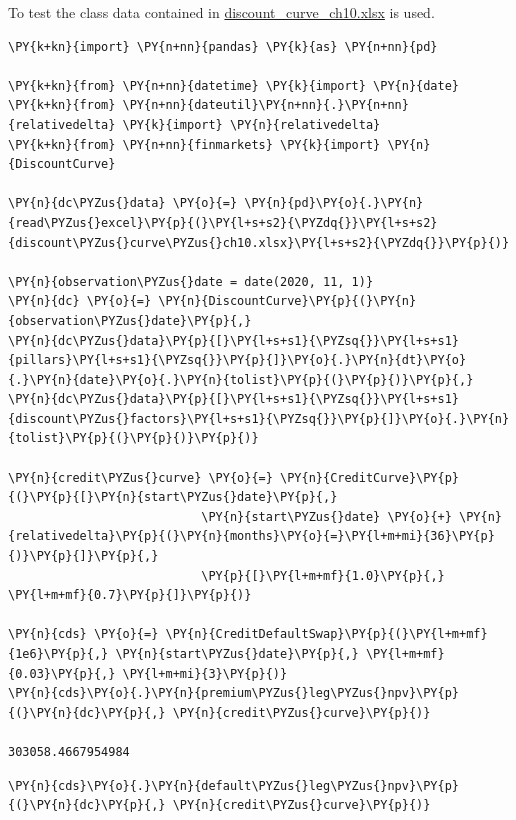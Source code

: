 {To test the class data contained in \href{https://drive.google.com/file/d/1mugHyet3H9tcSAvYvt8G4_kpfaEbVY7b/view?usp=sharing}{discount\_curve\_ch10.xlsx} is used.

\begin{tcolorbox}[breakable, size=fbox, boxrule=1pt, pad at break*=1mm,colback=cellbackground, colframe=cellborder]
\begin{Verbatim}[commandchars=\\\{\}]
\PY{k+kn}{import} \PY{n+nn}{pandas} \PY{k}{as} \PY{n+nn}{pd}
	
\PY{k+kn}{from} \PY{n+nn}{datetime} \PY{k}{import} \PY{n}{date}
\PY{k+kn}{from} \PY{n+nn}{dateutil}\PY{n+nn}{.}\PY{n+nn}{relativedelta} \PY{k}{import} \PY{n}{relativedelta}
\PY{k+kn}{from} \PY{n+nn}{finmarkets} \PY{k}{import} \PY{n}{DiscountCurve}
	
\PY{n}{dc\PYZus{}data} \PY{o}{=} \PY{n}{pd}\PY{o}{.}\PY{n}{read\PYZus{}excel}\PY{p}{(}\PY{l+s+s2}{\PYZdq{}}\PY{l+s+s2}{discount\PYZus{}curve\PYZus{}ch10.xlsx}\PY{l+s+s2}{\PYZdq{}}\PY{p}{)}

\PY{n}{observation\PYZus{}date = date(2020, 11, 1)}        
\PY{n}{dc} \PY{o}{=} \PY{n}{DiscountCurve}\PY{p}{(}\PY{n}{observation\PYZus{}date}\PY{p}{,} 
\PY{n}{dc\PYZus{}data}\PY{p}{[}\PY{l+s+s1}{\PYZsq{}}\PY{l+s+s1}{pillars}\PY{l+s+s1}{\PYZsq{}}\PY{p}{]}\PY{o}{.}\PY{n}{dt}\PY{o}{.}\PY{n}{date}\PY{o}{.}\PY{n}{tolist}\PY{p}{(}\PY{p}{)}\PY{p}{,}
\PY{n}{dc\PYZus{}data}\PY{p}{[}\PY{l+s+s1}{\PYZsq{}}\PY{l+s+s1}{discount\PYZus{}factors}\PY{l+s+s1}{\PYZsq{}}\PY{p}{]}\PY{o}{.}\PY{n}{tolist}\PY{p}{(}\PY{p}{)}\PY{p}{)}

\PY{n}{credit\PYZus{}curve} \PY{o}{=} \PY{n}{CreditCurve}\PY{p}{(}\PY{p}{[}\PY{n}{start\PYZus{}date}\PY{p}{,} 
                           \PY{n}{start\PYZus{}date} \PY{o}{+} \PY{n}{relativedelta}\PY{p}{(}\PY{n}{months}\PY{o}{=}\PY{l+m+mi}{36}\PY{p}{)}\PY{p}{]}\PY{p}{,} 
                           \PY{p}{[}\PY{l+m+mf}{1.0}\PY{p}{,} \PY{l+m+mf}{0.7}\PY{p}{]}\PY{p}{)}

\PY{n}{cds} \PY{o}{=} \PY{n}{CreditDefaultSwap}\PY{p}{(}\PY{l+m+mf}{1e6}\PY{p}{,} \PY{n}{start\PYZus{}date}\PY{p}{,} \PY{l+m+mf}{0.03}\PY{p}{,} \PY{l+m+mi}{3}\PY{p}{)}
\PY{n}{cds}\PY{o}{.}\PY{n}{premium\PYZus{}leg\PYZus{}npv}\PY{p}{(}\PY{n}{dc}\PY{p}{,} \PY{n}{credit\PYZus{}curve}\PY{p}{)}

303058.4667954984
\end{Verbatim}
\end{tcolorbox}

\begin{tcolorbox}[breakable, size=fbox, boxrule=1pt, pad at break*=1mm,colback=cellbackground, colframe=cellborder]
\begin{Verbatim}[commandchars=\\\{\}]
\PY{n}{cds}\PY{o}{.}\PY{n}{default\PYZus{}leg\PYZus{}npv}\PY{p}{(}\PY{n}{dc}\PY{p}{,} \PY{n}{credit\PYZus{}curve}\PY{p}{)}


\end{Verbatim}
\end{tcolorbox}}
